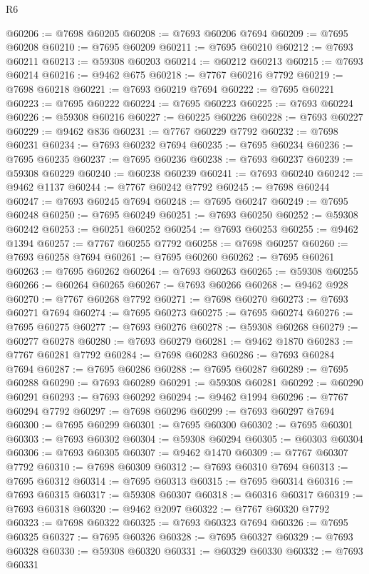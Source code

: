 \begin{lexlean}{R6}
\begin{coremodule}
@60206 := @7698 @60205
@60208 := @7693 @60206 @7694
@60209 := @7695 @60208
@60210 := @7695 @60209
@60211 := @7695 @60210
@60212 := @7693 @60211
@60213 := @59308 @60203
@60214 := @60212 @60213
@60215 := @7693 @60214
@60216 := @9462 @675
@60218 := @7767 @60216 @7792
@60219 := @7698 @60218
@60221 := @7693 @60219 @7694
@60222 := @7695 @60221
@60223 := @7695 @60222
@60224 := @7695 @60223
@60225 := @7693 @60224
@60226 := @59308 @60216
@60227 := @60225 @60226
@60228 := @7693 @60227
@60229 := @9462 @836
@60231 := @7767 @60229 @7792
@60232 := @7698 @60231
@60234 := @7693 @60232 @7694
@60235 := @7695 @60234
@60236 := @7695 @60235
@60237 := @7695 @60236
@60238 := @7693 @60237
@60239 := @59308 @60229
@60240 := @60238 @60239
@60241 := @7693 @60240
@60242 := @9462 @1137
@60244 := @7767 @60242 @7792
@60245 := @7698 @60244
@60247 := @7693 @60245 @7694
@60248 := @7695 @60247
@60249 := @7695 @60248
@60250 := @7695 @60249
@60251 := @7693 @60250
@60252 := @59308 @60242
@60253 := @60251 @60252
@60254 := @7693 @60253
@60255 := @9462 @1394
@60257 := @7767 @60255 @7792
@60258 := @7698 @60257
@60260 := @7693 @60258 @7694
@60261 := @7695 @60260
@60262 := @7695 @60261
@60263 := @7695 @60262
@60264 := @7693 @60263
@60265 := @59308 @60255
@60266 := @60264 @60265
@60267 := @7693 @60266
@60268 := @9462 @928
@60270 := @7767 @60268 @7792
@60271 := @7698 @60270
@60273 := @7693 @60271 @7694
@60274 := @7695 @60273
@60275 := @7695 @60274
@60276 := @7695 @60275
@60277 := @7693 @60276
@60278 := @59308 @60268
@60279 := @60277 @60278
@60280 := @7693 @60279
@60281 := @9462 @1870
@60283 := @7767 @60281 @7792
@60284 := @7698 @60283
@60286 := @7693 @60284 @7694
@60287 := @7695 @60286
@60288 := @7695 @60287
@60289 := @7695 @60288
@60290 := @7693 @60289
@60291 := @59308 @60281
@60292 := @60290 @60291
@60293 := @7693 @60292
@60294 := @9462 @1994
@60296 := @7767 @60294 @7792
@60297 := @7698 @60296
@60299 := @7693 @60297 @7694
@60300 := @7695 @60299
@60301 := @7695 @60300
@60302 := @7695 @60301
@60303 := @7693 @60302
@60304 := @59308 @60294
@60305 := @60303 @60304
@60306 := @7693 @60305
@60307 := @9462 @1470
@60309 := @7767 @60307 @7792
@60310 := @7698 @60309
@60312 := @7693 @60310 @7694
@60313 := @7695 @60312
@60314 := @7695 @60313
@60315 := @7695 @60314
@60316 := @7693 @60315
@60317 := @59308 @60307
@60318 := @60316 @60317
@60319 := @7693 @60318
@60320 := @9462 @2097
@60322 := @7767 @60320 @7792
@60323 := @7698 @60322
@60325 := @7693 @60323 @7694
@60326 := @7695 @60325
@60327 := @7695 @60326
@60328 := @7695 @60327
@60329 := @7693 @60328
@60330 := @59308 @60320
@60331 := @60329 @60330
@60332 := @7693 @60331

\end{coremodule}
\end{lexlean}
